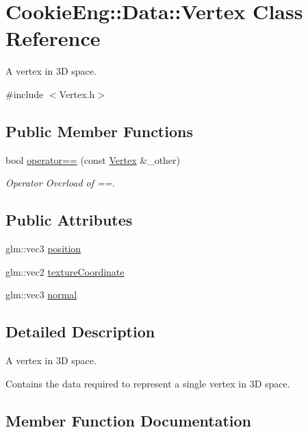 \hypertarget{struct_cookie_eng_1_1_data_1_1_vertex}{}\section{Cookie\+Eng\+:\+:Data\+:\+:Vertex Class Reference}
\label{struct_cookie_eng_1_1_data_1_1_vertex}


A vertex in 3D space.  




{\ttfamily \#include $<$Vertex.\+h$>$}

\subsection*{Public Member Functions}
\begin{DoxyCompactItemize}
\item 
bool \hyperlink{struct_cookie_eng_1_1_data_1_1_vertex_a59217b6844d411d5d0aeebc310e9e3fa}{operator==} (const \hyperlink{struct_cookie_eng_1_1_data_1_1_vertex}{Vertex} \&\+\_\+other)
\begin{DoxyCompactList}\small\item\em Operator Overload of ==. \end{DoxyCompactList}\end{DoxyCompactItemize}
\subsection*{Public Attributes}
\begin{DoxyCompactItemize}
\item 
glm\+::vec3 \hyperlink{struct_cookie_eng_1_1_data_1_1_vertex_aa199133d6ee0571a67dfdcccfb59ffeb}{position}
\item 
glm\+::vec2 \hyperlink{struct_cookie_eng_1_1_data_1_1_vertex_aed17d27b7219642e7937808547f18adf}{texture\+Coordinate}
\item 
glm\+::vec3 \hyperlink{struct_cookie_eng_1_1_data_1_1_vertex_a8bc3a87d6213bba88c6f095b149aba8a}{normal}
\end{DoxyCompactItemize}


\subsection{Detailed Description}
A vertex in 3D space. 

Contains the data required to represent a single vertex in 3D space. 

\subsection{Member Function Documentation}
\mbox{\label{struct_cookie_eng_1_1_data_1_1_vertex_a59217b6844d411d5d0aeebc310e9e3fa}} 
